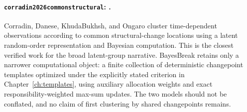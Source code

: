 
\paragraph{\texttt{corradin2026commonstructural}: \citet{corradin2026commonstructural}.}
Corradin, Danese, KhudaBukhsh, and Ongaro cluster time-dependent observations according to common structural-change locations using a latent random-order representation and Bayesian computation. This is the closest verified work for the broad latent-group narrative. BayesBreak retains only a narrower computational object: a finite collection of deterministic changepoint templates optimized under the explicitly stated criterion in Chapter~\ref{ch:templates}, using auxiliary allocation weights and exact responsibility-weighted max-sum updates. The two models should not be conflated, and no claim of first clustering by shared changepoints remains.
